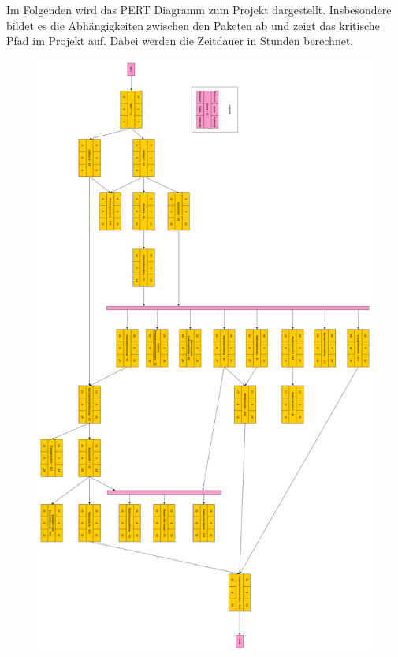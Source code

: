 \documentclass{article}
\begin{document}
Im Folgenden wird das PERT Diagramm zum Projekt dargestellt. 
Insbesondere bildet es die Abhängigkeiten zwischen den Paketen ab und zeigt das kritische Pfad im Projekt auf. 
Dabei werden die Zeitdauer in Stunden berechnet.

\begin{figure}[H]
	\centering
	\includegraphics[width = 38em]{PERT}
\end{figure}

\end{document}
